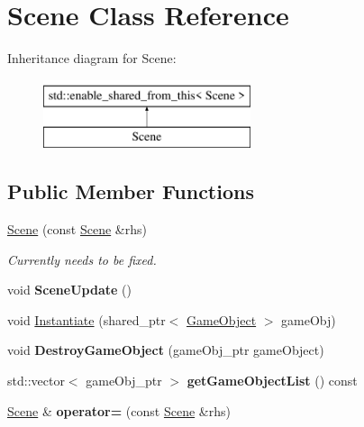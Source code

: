 \hypertarget{class_scene}{}\section{Scene Class Reference}
\label{class_scene}
Inheritance diagram for Scene\+:\begin{figure}[H]
\begin{center}
\leavevmode
\includegraphics[height=2.000000cm]{d6/db5/class_scene}
\end{center}
\end{figure}
\subsection*{Public Member Functions}
\begin{DoxyCompactItemize}
\item 
\mbox{\label{class_scene_a0caa1ccf717fe21059f20b0c4a57cde6}} 
\hyperlink{class_scene_a0caa1ccf717fe21059f20b0c4a57cde6}{Scene} (const \hyperlink{class_scene}{Scene} \&rhs)
\begin{DoxyCompactList}\small\item\em Currently needs to be fixed. \end{DoxyCompactList}\item 
\mbox{\label{class_scene_a1d902efeacc113ceb2dd79a976b04a77}} 
void {\bfseries Scene\+Update} ()
\item 
void \hyperlink{class_scene_a3dd730cba4a22bf75e54c4b644c26976}{Instantiate} (shared\+\_\+ptr$<$ \hyperlink{class_game_object}{Game\+Object} $>$ game\+Obj)
\item 
\mbox{\label{class_scene_ae418f788bfbf2551d89e907d1d4cf2f6}} 
void {\bfseries Destroy\+Game\+Object} (game\+Obj\+\_\+ptr game\+Object)
\item 
\mbox{\label{class_scene_a0696711d2b1452f3d6f42f7a92f4218d}} 
std\+::vector$<$ game\+Obj\+\_\+ptr $>$ {\bfseries get\+Game\+Object\+List} () const
\item 
\mbox{\label{class_scene_a64a47e6503f634ea2b76fa2078538716}} 
\hyperlink{class_scene}{Scene} \& {\bfseries operator=} (const \hyperlink{class_scene}{Scene} \&rhs)
\end{DoxyCompactItemize}
